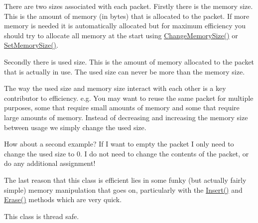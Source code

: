 There are two sizes associated with each packet. Firstly there is the memory size. This is the amount of memory (in bytes) that is allocated to the packet. If more memory is needed it is automatically allocated but for maximum efficiency you should try to allocate all memory at the start using \hyperlink{class_packet_a72a324d12c83b183f77194b5d9c4ab72}{ChangeMemorySize()} or \hyperlink{class_packet_a3f7bc12f83b1a98be540be061af6a8e6}{SetMemorySize()}. \par
\par


Secondly there is used size. This is the amount of memory allocated to the packet that is actually in use. The used size can never be more than the memory size.

The way the used size and memory size interact with each other is a key contributor to efficiency. e.g. You may want to reuse the same packet for multiple purposes, some that require small amounts of memory and some that require large amounts of memory. Instead of decreasing and increasing the memory size between usage we simply change the used size. \par
\par


How about a second example? If I want to empty the packet I only need to change the used size to 0. I do not need to change the contents of the packet, or do any additional assignment!\par
\par


The last reason that this class is efficient lies in some funky (but actually fairly simple) memory manipulation that goes on, particularly with the \hyperlink{class_packet_a7eba2a1d780f6723d98452c425f636c6}{Insert()} and \hyperlink{class_packet_a58b00ec8ee88525187c8a095572530a9}{Erase()} methods which are very quick. \par
\par


This class is thread safe. 

